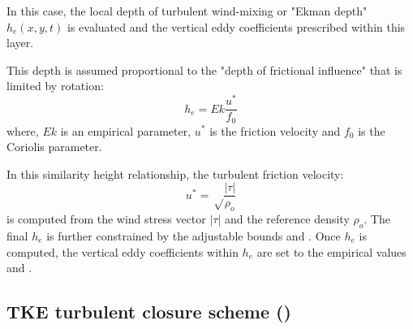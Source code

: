 \documentclass[../main/NEMO_manual]{subfiles}
\begin{document}
In this case, the local depth of turbulent wind-mixing or "Ekman depth" $h_{e}(x,y,t)$ is evaluated and
the vertical eddy coefficients prescribed within this layer.

This depth is assumed proportional to the "depth of frictional influence" that is limited by rotation:
\[
  h_{e} = Ek \frac {u^{*}} {f_{0}}
\]
where, $Ek$ is an empirical parameter, $u^{*}$ is the friction velocity and $f_{0}$ is the Coriolis parameter.

In this similarity height relationship, the turbulent friction velocity:
\[
  u^{*} = \sqrt \frac {|\tau|} {\rho_o}
\]
is computed from the wind stress vector $|\tau|$ and the reference density $ \rho_o$.
The final $h_{e}$ is further constrained by the adjustable bounds  and .
Once $h_{e}$ is computed, the vertical eddy coefficients within $h_{e}$ are set to
the empirical values  and  \citep{lermusiaux_JMS01}.

\subsection[TKE turbulent closure scheme (\forcode{ln_zdftke})]{TKE turbulent closure scheme (\protect{})}
\label{subsec:ZDF_tke}

\begin{listing}
  \caption{}
  \label{lst:namzdf_tke}
\end{listing}
\end{document}
